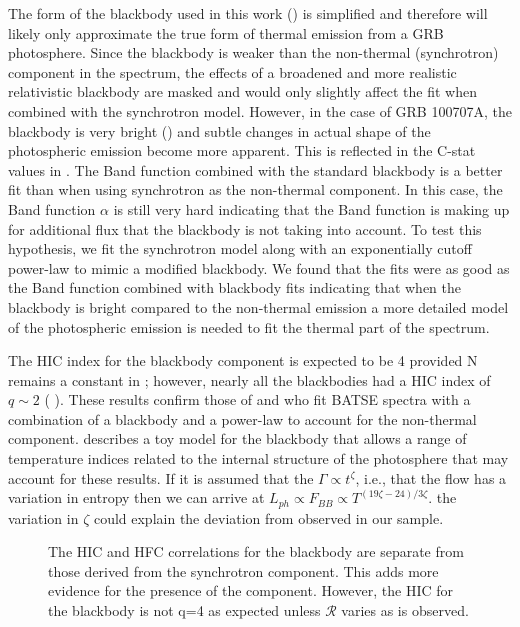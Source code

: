The form of the blackbody used in this work
() is simplified and therefore will likely
only approximate the true form of thermal emission from a GRB
photosphere. Since the blackbody is weaker than the non-thermal
(synchrotron) component in the spectrum, the effects of a broadened
and more realistic relativistic blackbody are masked and would only
slightly affect the fit when combined with the synchrotron
model. However, in the case of GRB 100707A, the blackbody is very
bright () and subtle changes in actual shape
of the photospheric emission become more apparent. This is reflected
in the C-stat values in . The Band function
combined with the standard blackbody is a better fit than when using
synchrotron as the non-thermal component. In this case, the Band
function $\alpha$ is still very hard indicating that the Band function
is making up for additional flux that the blackbody is not taking into
account. To test this hypothesis, we fit the synchrotron model along
with an exponentially cutoff power-law to mimic a modified
blackbody. We found that the fits were as good as the Band function
combined with blackbody fits indicating that when the blackbody is
bright compared to the non-thermal emission a more detailed model of
the photospheric emission is needed to fit the thermal part of the
spectrum.


The HIC index for the blackbody component is expected to be 4 provided
N remains a constant in ; however, nearly all the
blackbodies had a HIC index of $q\sim2$ (
). These results confirm those of
\cite{Ryde:2001} and \cite{Ryde:2005} who fit BATSE spectra with a
combination of a blackbody and a power-law to account for the
non-thermal component. \cite{Ryde:2006} describes a toy model for the
blackbody that allows a range of temperature indices related to the
internal structure of the photosphere that may account for these
results. If it is assumed that the $\Gamma \propto t^{\zeta}$, i.e.,
that the flow has a variation in entropy then we can arrive at $L_{ph}
\propto F_{BB} \propto T^{(19\zeta -24)/3\zeta}$. the variation in
$\zeta$ could explain the deviation from  observed
in our sample.
\begin{figure}[t]
\centering


\caption{The HIC and HFC correlations for the blackbody are separate
    from those derived from the synchrotron component. This adds more
    evidence for the presence of the component. However, the HIC for
    the blackbody is not q=4 as expected unless $\mathcal{R}$
      varies as is observed.}
\label{fig:kTcor}
\end{figure}

